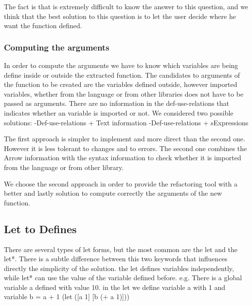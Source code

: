 The fact is that is extremely difficult to know the answer to this question, and
we think that the best solution to this question is to let the user decide where
he want the function defined.


\subsubsection{Computing the arguments}

In order to compute the arguments we have to know which variables are being define
inside or outside the extracted function.
The candidates to arguments of the function to be created are the variables defined
outside, however imported variables, whether from the language or from other libraries
does not have to be passed as arguments.
There are no information in the def-use-relations that indicates whether an variable
is imported or not.
We considered two possible solutions:
  -Def-use-relations + Text information
  -Def-use-relations + sExpressions

The first approach is simpler to implement and more direct than the second one.
However it is less tolerant to changes and to errors.
The second one combines the Arrow information with the syntax information to
check whether it is imported from the language or from other library.

We choose the second approach in order to provide the refactoring tool with a
better and lastly solution to compute correctly the arguments of the new function.

\subsection{Let to Defines}

There are several types of let forms, but the most common are the let and the let*.
There is a subtle difference between this two keywords that influences directly the simplicity of the solution.
the let defines variables independently, while let* can use the value of the variable defined before.
e.g.
There is a global variable a defined with value 10.
in the let we define variable a with 1 and variable b = a + 1
(let ([a 1]
[b (+ a 1)]))

